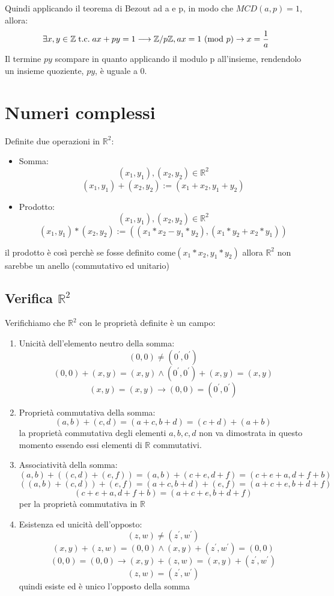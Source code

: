 \documentclass[a4paper,12pt]{article}
\newcommand{\Mod}[1]{\ (\mathrm{mod}\ #1)}
\begin{document}
	Quindi applicando il teorema di Bezout ad a e p, in modo che $MCD(a, p) = 1$, allora:
	\[\exists x,y \in \mathbb{Z} \tc ax + py = 1 \longrightarrow \mathbb{Z}/p\mathbb{Z}, ax = 1 \Mod p \rightarrow x = \frac{1}{a}\]
	Il termine $py$ scompare in quanto applicando il modulo p all'insieme, rendendolo un insieme quoziente, $py$, è uguale a 0.
	\section{Numeri complessi}
	Definite due operazioni in $\mathbb{R}^2$:
	\begin{itemize}
		\item Somma:
		\[(x_1, y_1), (x_2, y_2) \in \mathbb{R}^2\]
		\[(x_1, y_1) + (x_2, y_2) := (x_1 + x_2, y_1 + y_2)\]
		\item Prodotto:
		\[(x_1, y_1), (x_2, y_2) \in \mathbb{R}^2\]
		\[(x_1, y_1) * (x_2, y_2) := ((x_1 * x_2 - y_1*y_2), (x_1 * y_2 + x_2 * y_1))\]
	\end{itemize}
	il prodotto è così perchè se fosse definito come$(x_1 * x_2 , y_1 * y_2)$ allora $\mathbb{R}^2$ non sarebbe un anello (commutativo ed unitario)
	
	\subsection{Verifica $\mathbb{R}^2$}
	Verifichiamo che $\mathbb{R}^2$ con le proprietà definite è un campo:
	\begin{enumerate}
		\item Unicità dell'elemento neutro della somma:
		\[(0, 0) \not = (0^\prime, 0^\prime)\]
		\[(0, 0) + (x, y) = (x,y) \wedge (0^\prime, 0^\prime) + (x, y) = (x, y)\]
		\[(x, y) = (x, y) \rightarrow (0, 0) = (0^\prime, 0^\prime)\]
		\item Proprietà commutativa della somma:
		\[(a, b) + (c, d) = (a + c, b + d) = (c + d) + (a + b)\]
		la proprietà commutativa degli elementi $a,b,c,d$ non va dimostrata in questo momento essendo essi elementi di $\mathbb{R}$ commutativi.
		\item Associatività della somma:
		\[(a, b) + ((c, d) + (e, f)) = (a, b) + (c + e, d + f) = (c + e + a, d + f+ b)\]
		\[((a,b) +  (c, d)) + (e, f) = (a + c, b + d) + (e, f) = (a + c + e, b + d + f)\]
		\[(c + e + a, d + f+ b) = (a + c + e, b + d + f)\]
		per la proprietà commutativa in $\mathbb{R}$
		\item Esistenza ed unicità dell'opposto:
		\[(z, w) \not = (z^\prime, w^\prime)\]
		\[(x, y) + (z, w) = (0, 0) \wedge (x, y) + (z^\prime, w^\prime) = (0, 0)\]
		\[(0, 0) = (0, 0) \rightarrow (x, y) + (z, w) = (x, y) + (z^\prime, w^\prime)\]
		\[(z, w) = (z^\prime, w^\prime)\]
		quindi esiste ed è unico l'opposto della somma
	\end{enumerate}
	
\end{document}
